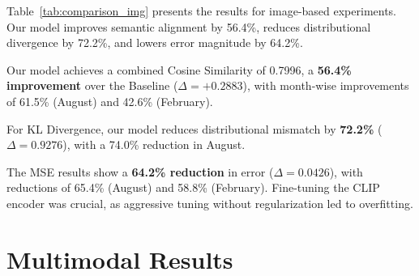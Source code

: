 Table~\ref{tab:comparison_img} presents the results for image-based experiments. Our model improves semantic alignment by 56.4\%, reduces distributional divergence by 72.2\%, and lowers error magnitude by 64.2\%.

\begin{table}[h]
    \centering
    \caption{Performance comparison between Baseline and Our Model for image-based experiments. The Baseline model is \textbf{CLIP ViT-L/14}, applied without fine-tuning. Higher values are better for $\uparrow$, and lower values are better for $\downarrow$. Bold values indicate combined scores.}
    \label{tab:comparison_img}
\end{table}

Our model achieves a combined Cosine Similarity of 0.7996, a \textbf{56.4\% improvement} over the Baseline ($\Delta = +0.2883$), with month-wise improvements of 61.5\% (August) and 42.6\% (February).
\newline

For KL Divergence, our model reduces distributional mismatch by \textbf{72.2\%} ($\Delta = 0.9276$), with a 74.0\% reduction in August.
\newline

The MSE results show a \textbf{64.2\% reduction} in error ($\Delta = 0.0426$), with reductions of 65.4\% (August) and 58.8\% (February). Fine-tuning the CLIP encoder was crucial, as aggressive tuning without regularization led to overfitting.

\section{Multimodal Results}
\label{sec:multimodal-results}

